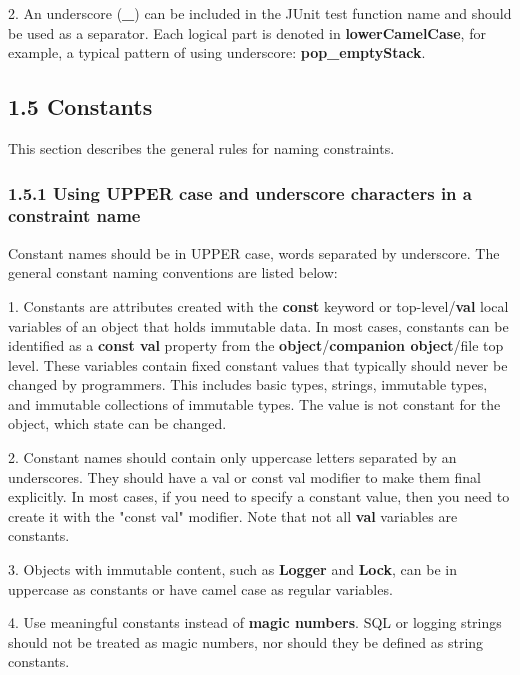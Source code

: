 {{{{{{{{{{{{2.	An underscore (\textbf{_}) can be included in the JUnit test function name and should be used as a separator. Each logical part is denoted in \textbf{lowerCamelCase}, for example, a typical pattern of using underscore: \textbf{pop_emptyStack}.

\subsection*{\textbf{1.5 Constants}}

\label{sec:1.5}

This section describes the general rules for naming constraints.

\subsubsection*{\textbf{1.5.1 Using UPPER case and underscore characters in a constraint name}}
\leavevmode\newline

\label{sec:1.5.1}

Constant names should be in UPPER case, words separated by underscore. The general constant naming conventions are listed below:

1. Constants are attributes created with the \textbf{const} keyword or top-level/\textbf{val} local variables of an object that holds immutable data. In most cases, constants can be identified as a \textbf{const val} property from the \textbf{object}/\textbf{companion object}/file top level. These variables contain fixed constant values that typically should never be changed by programmers. This includes basic types, strings, immutable types, and immutable collections of immutable types. The value is not constant for the object, which state can be changed.

2. Constant names should contain only uppercase letters separated by an underscores. They should have a val or const val modifier to make them final explicitly. In most cases, if you need to specify a constant value, then you need to create it with the "const val" modifier. Note that not all \textbf{val} variables are constants.

3. Objects with immutable content, such as \textbf{Logger} and \textbf{Lock}, can be in uppercase as constants or have camel case as regular variables.

4. Use meaningful constants instead of \textbf{magic numbers}. SQL or logging strings should not be treated as magic numbers, nor should they be defined as string constants.

}}}}}}}}}}}}
